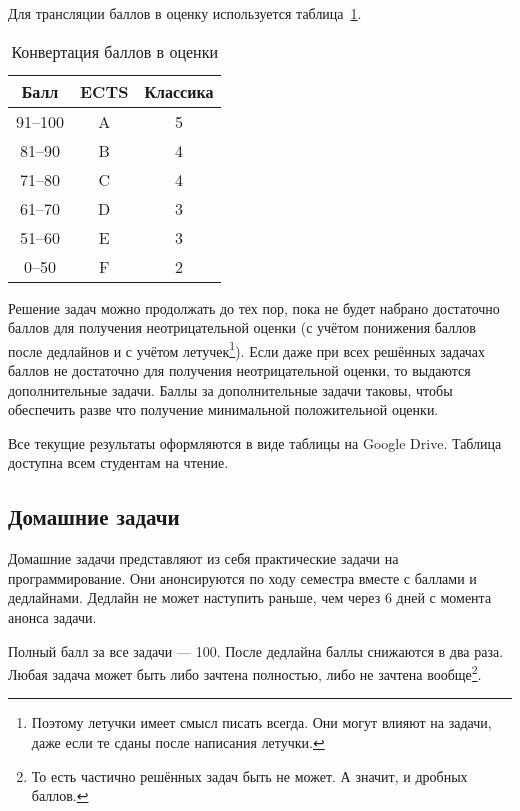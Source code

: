 Для трансляции баллов в оценку используется таблица~\ref{tbl:ects}.

\begin{table}[h]
    \caption{Конвертация баллов в оценки}
    \label{tbl:ects}
\begin{center}
    \begin{tabular}{ | c | c | c |}
        \hline
        Балл & ECTS & Классика \\ 
        \hline
        \hline
        91--100 & A & 5 \\  
        81--90  & B & 4 \\  
        71--80  & C & 4 \\  
        61--70  & D & 3 \\  
        51--60  & E & 3 \\  
         0--50  & F & 2 \\   
        \hline
    \end{tabular}
\end{center}
\end{table}

Решение задач можно продолжать до тех пор, пока не будет набрано достаточно баллов для получения неотрицательной оценки (с учётом понижения баллов после дедлайнов и с учётом летучек\footnote{Поэтому летучки имеет смысл писать всегда. Они могут влияют на задачи, даже если те сданы после написания летучки.}). 
Если даже при всех решённых задачах баллов не достаточно для получения неотрицательной оценки, то выдаются дополнительные задачи. 
Баллы за дополнительные задачи таковы, чтобы обеспечить разве что получение минимальной положительной оценки. 

Все текущие результаты оформляются в виде таблицы на Google Drive.
Таблица доступна всем студентам на чтение.

\subsection{Домашние задачи}

Домашние задачи представляют из себя практические задачи на программирование.
Они анонсируются по ходу семестра вместе с баллами и дедлайнами.
Дедлайн не может наступить раньше, чем через 6 дней с момента анонса задачи.

Полный балл за все задачи --- 100. После дедлайна баллы снижаются в два раза. Любая задача может быть либо зачтена полностью, либо не зачтена вообще\footnote{То есть частично решённых задач быть не может. А значит, и дробных баллов.}.

